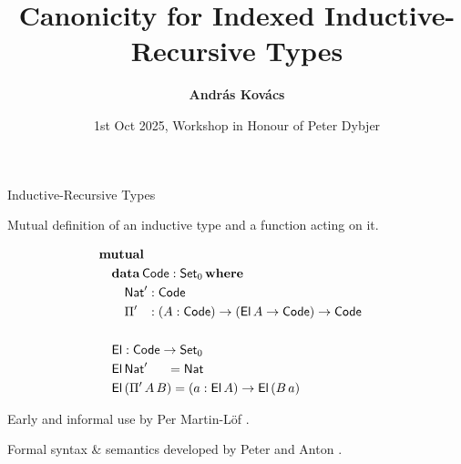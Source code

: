 \documentclass[dvipsnames,aspectratio=169]{beamer}
\title{Canonicity for Indexed Inductive-Recursive Types}
\author{\textbf{András Kovács}}
\institute{
  \inst%
       {University of Gothenburg \& Chalmers University of Technology}
}
\date{1st Oct 2025, Workshop in Honour of Peter Dybjer}
\newcommand{\ms}[1]{\mathsf{#1}}
\newcommand{\mbf}[1]{\mathbf{#1}}
\newcommand{\data}{\mbf{data}}
\newcommand{\Set}{\ms{Set}}
\newcommand{\where}{\mbf{where}}
\newcommand{\Nat}{\ms{Nat}}
\newcommand{\El}{\ms{El}}
\newcommand{\Code}{\ms{Code}}
\begin{document}
\frame{\titlepage}

\begin{frame}{Inductive-Recursive Types}

Mutual definition of an inductive type and a function acting on it.

\vspace{-1em}
\begin{alignat*}{3}
  & \mbf{mutual} \\
  & \quad\data\,\Code : \Set_0\,\where \\
  & \quad\quad \Nat' : \Code\\
  & \quad\quad \Pi' \hspace{0.8em} : (A : \Code) \to (\El\,A \to \Code) \to \Code
  & \\
  & \\
  & \quad\El : \Code \to \Set_0 \\
  & \quad\El\,\Nat'\hspace{1.5em}  = \Nat \\
  & \quad\El\,(\Pi'\,A\,B) = (a : \El\,A) \to \El\,(B\,a)
\end{alignat*}
\vspace{-0.5em}

Early and informal use by Per Martin-Löf \cite{martin1975intuitionistic,martinlof84sambin}.
\vspace{1em}

Formal syntax \& semantics developed by Peter and Anton \cite{dybjer00ir,dybjer99finite,DBLP:journals/apal/DybjerS03,DBLP:journals/jlp/DybjerS06}.
\vspace{1em}


\end{frame}
\end{document}
